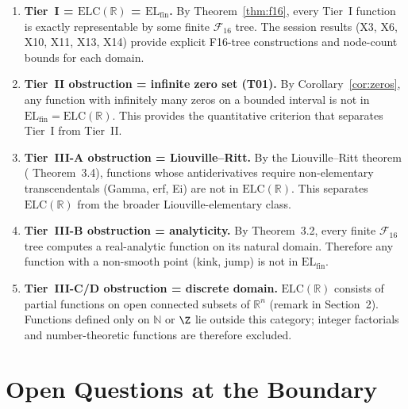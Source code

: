 \documentclass[12pt,a4paper]{article}
\theoremstyle{definition}
\newcommand{\ELC}{\mathrm{ELC}(\mathbb{R})}
\newcommand{\ELfin}{\mathrm{EL}_{\mathrm{fin}}}
\newcommand{\R}{\mathbb{R}}
\newcommand{\N}{\mathbb{N}}
\newcommand{\F}{\mathcal{F}_{16}}
\begin{document}
\begin{enumerate}[label=\textbf{(\alph*)}, itemsep=6pt]
\item \textbf{Tier~I = $\ELC$ = $\ELfin$.}
  By Theorem~\ref{thm:f16}, every Tier~I function is exactly representable
  by some finite $\F$ tree.  The session results (X3, X6, X10, X11, X13,
  X14) provide explicit F16-tree constructions and node-count bounds for
  each domain.

\item \textbf{Tier~II obstruction = infinite zero set (T01).}
  By Corollary~\ref{cor:zeros}, any function with infinitely many zeros on a
  bounded interval is not in $\ELfin = \ELC$.  This provides the quantitative
  criterion that separates Tier~I from Tier~II.

\item \textbf{Tier~III-A obstruction = Liouville--Ritt.}
  By the Liouville--Ritt theorem (\cite{F16} Theorem~3.4), functions whose
  antiderivatives require non-elementary transcendentals (Gamma, erf, Ei)
  are not in $\ELC$.  This separates $\ELC$ from the broader
  Liouville-elementary class.

\item \textbf{Tier~III-B obstruction = analyticity.}
  By \cite{F16} Theorem~3.2, every finite $\F$ tree computes a real-analytic
  function on its natural domain.  Therefore any function with a non-smooth
  point (kink, jump) is not in $\ELfin$.

\item \textbf{Tier~III-C/D obstruction = discrete domain.}
  $\ELC$ consists of partial functions on open connected subsets of $\R^n$
  (remark in \cite{F16} Section~2).  Functions defined only on $\N$ or $\Z$
  lie outside this category; integer factorials and number-theoretic
  functions are therefore excluded.
\end{enumerate}

\section{Open Questions at the Boundary}
\label{sec:open}
\end{document}
